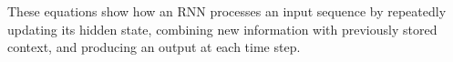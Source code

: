 \documentclass{article}
\begin{document}
These equations show how an RNN processes an input sequence by repeatedly updating its hidden state, combining new information with previously stored context, and producing an output at each time step.










\end{document}
